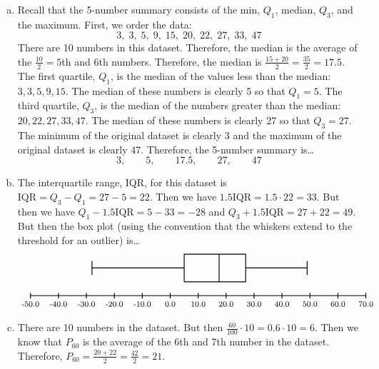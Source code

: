 \documentclass[11pt,letterpaper]{article}
\begin{document}
\sol 
\begin{enumerate}[(a)]
\item Recall that the 5-number summary consists of the min, $Q_1$, median, $Q_3$, and the maximum. First, we order the data:
	\[
	3, \; 3, \; 5, \; 9, \; 15, \; 20, \; 22, \; 27, \; 33, \; 47
	\]
There are 10 numbers in this dataset. Therefore, the median is the average of the $\frac{10}{2}= 5$th and 6th numbers. Therefore, the median is $\frac{15 + 20}{2}= \frac{35}{2}= 17.5$. The first quartile, $Q_1$, is the median of the values less than the median: $3, 3, 5, 9, 15$. The median of these numbers is clearly 5 so that $Q_1= 5$. The third quartile, $Q_3$, is the median of the numbers greater than the median: $20, 22, 27, 33, 47$. The median of these numbers is clearly 27 so that $Q_3= 27$. The minimum of the original dataset is clearly 3 and the maximum of the original dataset is clearly 47. Therefore, the 5-number summary is\dots
	\[
	3, \qquad 5, \qquad 17.5, \qquad 27, \qquad 47
	\] \pspace

\item The interquartile range, IQR, for this dataset is $\text{IQR}= Q_3 - Q_1= 27 - 5= 22$. Then we have $1.5 \text{IQR}= 1.5 \cdot 22= 33$. But then we have $Q_1 - 1.5 \text{IQR}= 5 - 33= -28$ and $Q_3 + 1.5 \text{IQR}= 27 + 22= 49$. But then the box plot (using the convention that the whiskers extend to the threshold for an outlier) is\dots
	\[
	\begin{tikzpicture}
	\draw[line width=0.03cm] (0,0) -- (12,0);
	\foreach \x in {0,1,...,12} {
		\pgfmathsetmacro\tickval{-50 + 10*\x}
		\draw[line width=0.03cm] (\x,-0.1) -- (\x,0.1);
		\node at (\x,-0.3) {\footnotesize\tickval};
		}
	\draw[line width=0.03cm] (5.5,0.5) -- (5.5,1.5) -- (7.7,1.5) -- (7.7,0.5) -- (5.5,0.5);
	\draw[line width=0.03cm] (6.75,0.5) -- (6.75,1.5);
	\draw[line width=0.03cm] (2.2,1) -- (5.5,1);
	\draw[line width=0.03cm] (2.2,0.75) -- (2.2,1.25);
	\draw[line width=0.03cm] (7.7,1) -- (9.9,1);
	\draw[line width=0.03cm] (9.9,0.75) -- (9.9,1.25);
	\end{tikzpicture}
	\] \pspace

\item There are 10 numbers in the dataset. But then $\frac{60}{100} \cdot 10= 0.6 \cdot 10= 6$. Then we know that $P_{60}$ is the average of the 6th and 7th number in the dataset. Therefore, $P_{60}= \frac{20 + 22}{2}= \frac{42}{2}= 21$. 
\end{enumerate}
\end{document}

